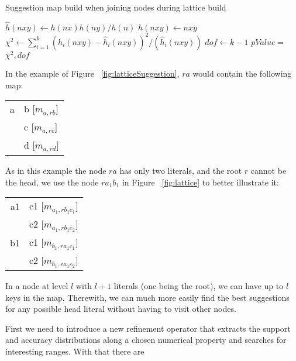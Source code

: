 \begin{algorithm}[h!]
 \caption{Suggestion map build when joining nodes during lattice build}
 \label{alg:buildmaps}
  $\hat{h}(nxy) \leftarrow h(nx)h(ny)/h(n)$ \;
  $h(nxy) \leftarrow $$nxy$\FuncSty{)} \;
  $\chi^2 \leftarrow \sum_{i=1}^{k}(h_i(nxy)-\hat{h}_i(nxy))^2/(\hat{h}_i(nxy))$ \;
  $dof \leftarrow k-1$ \;
  $pValue = $$\chi^2,dof$\FuncSty{)} \;
\end{algorithm}

In the example of Figure ~\ref{fig:latticeSuggestion}, $ra$ would contain the following map:

\begin{center}
  \begin{tabular}{r | l}
    a & b [$m_{a,rb}$] \\
      & c [$m_{a,rc}$] \\
      & d [$m_{a,rd}$]
  \end{tabular}
\end{center}

As in this example the node $ra$ has only two literals, and the root $r$ cannot be the head, we use the node $ra_1b_1$
in Figure ~\ref{fig:lattice} to better illustrate it:

\begin{center}
  \begin{tabular}{r | l}
    a1 	& c1 [$m_{a_1,rb_1c_1}$] \\
	& c2 [$m_{a_1,rb_1c_2}$] \\
    \hline
    b1	& c1 [$m_{b_1,ra_1c_1}$] \\
	& c2 [$m_{b_1,ra_1c_2}$]
  \end{tabular}
\end{center}

In a node at level $l$ with $l+1$ literals (one being the root), we can have up to $l$ keys in the map. Therewith, we
can much more easily find the best suggestions for any possible head literal without having to visit other nodes.

First we need to introduce a new refinement operator that extracts the support and accuracy distributions along a chosen
numerical property and searches for interesting ranges. With that there are

